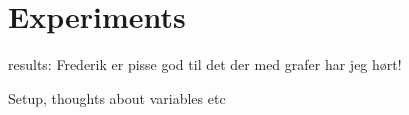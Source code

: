 \section{Experiments}

results: Frederik er pisse god til det der med grafer har jeg hørt!

Setup, thoughts about variables etc

